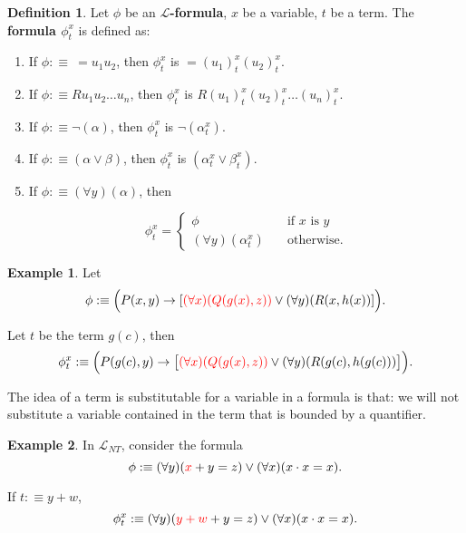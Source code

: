 \documentclass[11pt,letterpaper]{book}
\theoremstyle{definition}
\newtheorem{definition}{Definition}[section]
\newtheorem{example}{Example}[section]
\begin{document}
\begin{definition}\label{def:formula_substitution}
Let $\phi$ be an \textbf{$\mathcal{L}$-formula}, $x$ be a variable, $t$
be a term. The \textbf{formula $\phi_t ^x $} is defined as:
\begin{enumerate}
\item{If $\phi :\equiv \ = u_1 u_2$, then $\phi_t ^x $ is $ = (u_1)_t ^x
(u_2)_t ^x $.}
\item{If $\phi :\equiv R u_1 u_2 \ldots u_n$, then $\phi_t ^x$ is
$R(u_1)_t ^x (u_2)_t ^x \ldots (u_n)_t ^x $. }
\item{If $\phi :\equiv \lnot (\alpha) $, then $\phi_t ^x $ is $\lnot (
\alpha_t ^x )$.}
\item{If $\phi :\equiv (\alpha \lor \beta) $, then $\phi_t ^x $ is
$(\alpha_t ^x \lor \beta_t ^x)$. }
\item{If $\phi :\equiv (\forall y) (\alpha) $, then}

\begin{equation}
\phi_t ^x = \begin{cases}
\phi & \quad \mbox{if } x \mbox{ is } y  \\
(\forall y) (\alpha_t ^x) & \quad \mbox{otherwise.}
\end{cases}  \nonumber
\end{equation}

\end{enumerate}
\end{definition}

\begin{example}
Let $$\phi :\equiv \Big( P(x, y) \rightarrow [{\color{red}(\forall x)(
Q(g(x), z))} \lor (\forall y)( R(x, h(x)) ] \Big) .$$

Let $t$ be the term $g(c)$, then
$$ \phi_t ^x :\equiv \Big( P(g(c), y) \rightarrow
\big[{\color{red}(\forall x)( Q(g(x), z))} \lor (\forall y)( R(g(c),
h(g(c))) \big] \Big) . $$

\end{example}


The idea of a term is substitutable for a variable in a formula is that:
we will not substitute a variable contained in the term that is bounded
by a quantifier.

\begin{example}
In $\mathcal{L}_{NT}$, consider the formula
$$ \phi :\equiv (\forall y) ({\color{red}x}+y=z) \lor (\forall x ) (x
\cdot x = x) .$$

If $t:\equiv y + w$,
$$ \phi_t ^x :\equiv (\forall y) ( {\color{red}y+w}+y = z ) \lor
(\forall x) (x \cdot x = x) .$$
\end{example}
\end{document}
